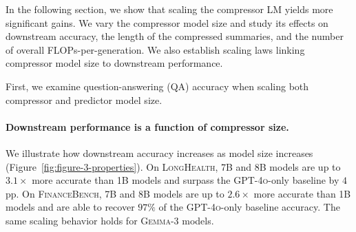 \documentclass{article} %
\begin{document}
In the following section, we show that scaling the compressor LM yields more significant gains. We vary the compressor model size and study its effects on downstream accuracy, the length of the compressed summaries, and the number of overall FLOPs-per-generation. We also establish scaling laws linking compressor model size to downstream performance.

First, we examine question-answering (QA) accuracy when scaling both compressor and predictor model size.


\paragraph*{Downstream performance is a function of compressor size.} 
We illustrate how downstream accuracy increases as model size increases (Figure~\ref{fig:figure-3-properties}).
On \textsc{LongHealth}, 7B and 8B models are up to \(3.1\times\) more accurate than 1B models and surpass the \textsc{GPT-4o}-only baseline by $4$pp. On \textsc{FinanceBench}, 7B and 8B models are up to \(2.6\times\) more accurate than 1B models and are able to recover \(97\%\) of the \textsc{GPT-4o}-only baseline accuracy. The same scaling behavior holds for \textsc{Gemma-3} models.
\end{document}
